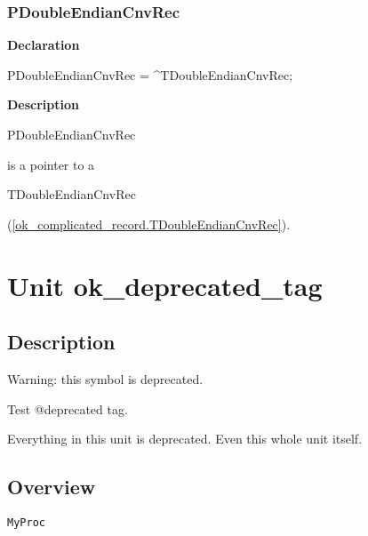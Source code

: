 \documentclass{report}
\newif\ifpdf
\begin{document}
\subsection*{PDoubleEndianCnvRec}
\fi
\label{ok_complicated_record-PDoubleEndianCnvRec}
\begin{list}{}{
\setlength{\itemindent}{0cm}
\setlength{\listparindent}{0cm}
\setlength{\leftmargin}{\evensidemargin}
\addtolength{\leftmargin}{\tmplength}
\settowidth{\labelsep}{X}
\addtolength{\leftmargin}{\labelsep}
\setlength{\labelwidth}{\tmplength}
}
\item[\textbf{Declaration}\hfill]
\ifpdf
\begin{flushleft}
\fi
\begin{ttfamily}
PDoubleEndianCnvRec = {\^{}}TDoubleEndianCnvRec;\end{ttfamily}

\ifpdf
\end{flushleft}
\fi

\par
\item[\textbf{Description}]
\begin{ttfamily}PDoubleEndianCnvRec\end{ttfamily} is a pointer to a \begin{ttfamily}TDoubleEndianCnvRec\end{ttfamily}(\ref{ok_complicated_record.TDoubleEndianCnvRec}).

\end{list}
\chapter{Unit ok{\_}deprecated{\_}tag}
\label{ok_deprecated_tag}
\section{Description}
Warning: this symbol is deprecated.

Test @deprecated tag.\hfill\vspace*{1ex}



Everything in this unit is deprecated. Even this whole unit itself.


\section{Overview}
\begin{description}
\item[\texttt{\begin{ttfamily}TMyClass\end{ttfamily} Class}]
\end{description}
\begin{description}
\item[\texttt{MyProc}]
\end{description}
\end{document}
